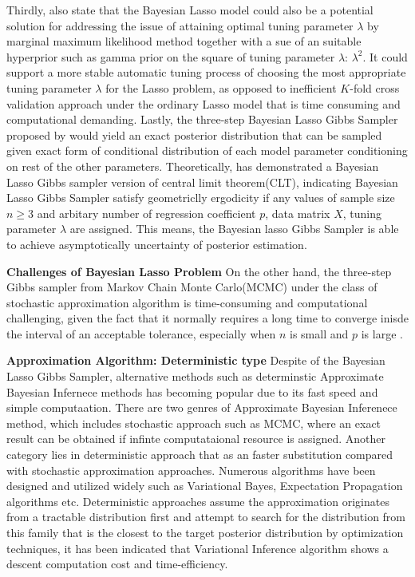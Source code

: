 Thirdly, \cite{park_casella_2008} also state that the Bayesian Lasso model could also be a potential solution for addressing the issue of attaining optimal tuning parameter $\lambda$ by marginal maximum likelihood method together with a sue of an suitable hyperprior such as gamma prior on the square of tuning parameter $\lambda$: $\lambda^2$. 
It could support a more stable automatic tuning process of choosing the most appropriate tuning parameter $\lambda$ for the Lasso problem, as opposed to inefficient $K$-fold cross validation approach under the ordinary Lasso model that is time consuming and computational demanding. Lastly, the three-step Bayesian Lasso Gibbs Sampler proposed by \cite{park_casella_2008} would yield an exact posterior distribution that can be sampled given exact form of conditional distribution of each model parameter conditioning on rest of the other parameters. Theoretically, \cite{khare_hobert_2013} has demonstrated a Bayesian Lasso Gibbs sampler version of central limit theorem(CLT), indicating Bayesian Lasso Gibbs Sampler satisfy geometriclly ergodicity if any values of sample size $n \geq 3$ and arbitary number of regression coefficient $p$, data matrix $X$, tuning parameter $\lambda$ are assigned. This means, the Bayesian lasso Gibbs Sampler is able to achieve asymptotically uncertainty of posterior estimation. 


\textbf{Challenges of Bayesian Lasso Problem}
On the other hand, the three-step Gibbs sampler from Markov Chain Monte Carlo(MCMC) under the class of stochastic approximation algorithm is time-consuming and computational challenging, given the fact that it normally requires a long time to converge inisde the interval of an acceptable tolerance, especially when $n$ is small and $p$ is large \cite{rajaratnam_sparks_2015}. 





\textbf{Approximation Algorithm: Deterministic type}
Despite of the Bayesian Lasso Gibbs Sampler, alternative methods such as determinstic Approximate Bayesian Infernece methods has becoming popular due to its fast speed and simple computaation. There are two genres of Approximate Bayesian Inferenece method, which includes stochastic approach such as MCMC, where an exact result can be obtained if infinte computataional resource is assigned. Another category lies in deterministic approach that as an faster substitution compared with stochastic approximation approaches. Numerous algorithms have been designed and utilized widely such as Variational Bayes, Expectation Propagation algorithms etc. Deterministic approaches assume the approximation originates from a tractable distribution first and attempt to search for the distribution from this family that is the closest to the target posterior distribution by optimization techniques, it has been indicated that Variational Inference algorithm shows a descent computation cost and time-efficiency. 


